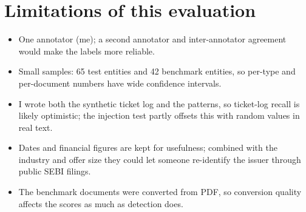 \documentclass[11pt,a4paper]{article}
\begin{document}
\section{Limitations of this evaluation}
\begin{itemize}
\item One annotator (me); a second annotator and inter-annotator agreement would make the labels more reliable.
\item Small samples: 65 test entities and 42 benchmark entities, so per-type and per-document numbers have wide confidence intervals.
\item I wrote both the synthetic ticket log and the patterns, so ticket-log recall is likely optimistic; the injection test partly offsets this with random values in real text.
\item Dates and financial figures are kept for usefulness; combined with the industry and offer size they could let someone re-identify the issuer through public SEBI filings.
\item The benchmark documents were converted from PDF, so conversion quality affects the scores as much as detection does.
\end{itemize}
\end{document}
